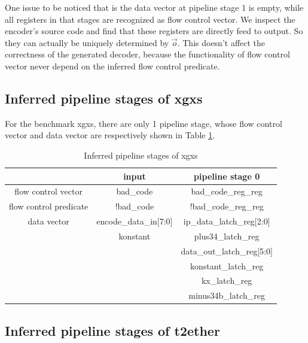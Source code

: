 \documentclass[conference]{IEEEtran}
\begin{document}
One issue to be noticed that is the data vector at pipeline stage 1 is empty,
while all registers in that stages are recognized as flow control vector.
We inspect the encoder's source code and find that these registers are 
directly feed to output.
So they can actually be uniquely determined by $\vec{o}$.
This doesn't affect the correctness of the generated decoder,
because the functionality of flow control vector never depend on the inferred flow control predicate.


\subsection{Inferred pipeline stages of xgxs}


For the benchmark xgxs,
there are only 1 pipeline stage,
whose flow control vector and data vector are respectively shown in Table \ref{tab_xgxs}.

\begin{table}[b]
\centering
\caption{Inferred pipeline stages of xgxs}
\begin{tabular}{|c|c|c|}
\hline
                       & input                  &  pipeline stage 0    \\\hline\hline
flow control vector    &bad\_code               & bad\_code\_reg\_reg\\\hline
flow control predicate &!bad\_code              & !bad\_code\_reg\_reg \\\hline
data vector            &encode\_data\_in[7:0]   &ip\_data\_latch\_reg[2:0] \\
                       &konstant                &plus34\_latch\_reg     \\
                       &                        &data\_out\_latch\_reg[5:0]\\
                       &                        &konstant\_latch\_reg   \\
                       &                        &kx\_latch\_reg         \\
                       &                        &minus34b\_latch\_reg   \\\hline
\end{tabular}\label{tab_xgxs} 
\end{table}


\subsection{Inferred pipeline stages of t2ether}
\end{document}
